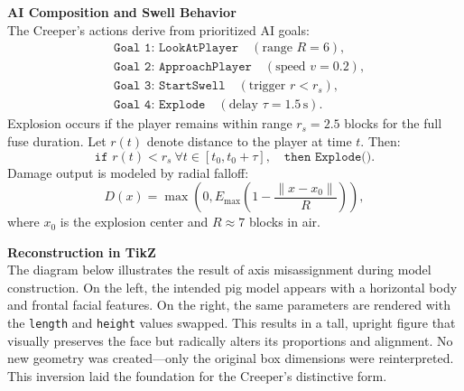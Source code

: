 \begin{technical}
\vspace{0.3em}
\noindent\textbf{AI Composition and Swell Behavior}\\[0.5em]
The Creeper’s actions derive from prioritized AI goals:
\begin{align*}
&\texttt{Goal 1: LookAtPlayer} \quad (\text{range } R = 6), \\
&\texttt{Goal 2: ApproachPlayer} \quad (\text{speed } v = 0.2), \\
&\texttt{Goal 3: StartSwell} \quad (\text{trigger } r < r_s), \\
&\texttt{Goal 4: Explode} \quad (\text{delay } \tau = 1.5\,\text{s}).
\end{align*}
Explosion occurs if the player remains within range \( r_s = 2.5 \) blocks for the full
fuse duration. Let \( r(t) \) denote distance to the player at time \( t \). Then:
\[
\texttt{if } r(t) < r_s \ \forall t \in [t_0, t_0 + \tau],
\quad \texttt{then } \texttt{Explode()}.
\]
Damage output is modeled by radial falloff:
\[
D(x) = \max\left(0, E_{\max}
\left(1 - \frac{\|x - x_0\|}{R}\right)\right),
\]
where \( x_0 \) is the explosion center and \( R \approx 7 \) blocks in air.

\vspace{0.3em}
\noindent\textbf{Reconstruction in TikZ}\\[0.5em]
The diagram below illustrates the result of axis misassignment during model construction.
On the left, the intended pig model appears with a horizontal body and frontal facial features.
On the right, the same parameters are rendered with the \texttt{length} and \texttt{height}
values swapped. This results in a tall, upright figure that visually preserves the face but
radically alters its proportions and alignment. No new geometry was created—only the
original box dimensions were reinterpreted. This inversion laid the foundation for the
Creeper’s distinctive form.

\begin{center}
\end{center}
\end{technical}
